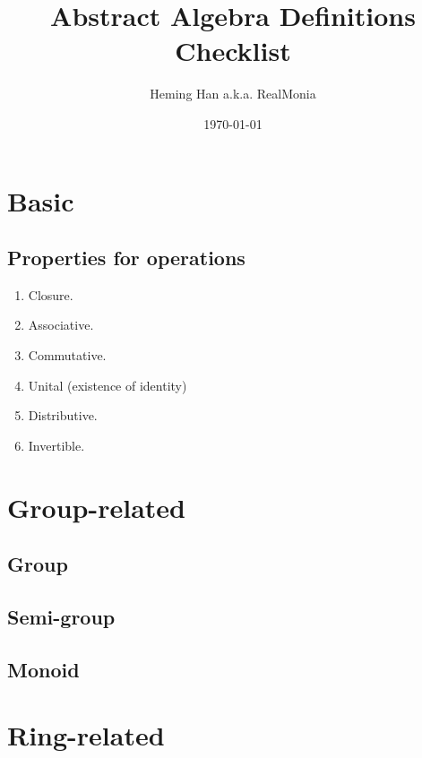 \documentclass[letter]{article}
\author{Heming Han a.k.a. RealMonia}
\title{\bf Abstract Algebra Definitions Checklist}
\date{\today}
\begin{document}
\maketitle
\section{Basic}
\subsection{Properties for operations}
\begin{enumerate}
    \item Closure.
    \item Associative.
    \item Commutative.
    \item Unital (existence of identity)
    \item Distributive.
    \item Invertible.
\end{enumerate}
\section{Group-related}
\subsection{Group}
\subsection{Semi-group}
\subsection{Monoid}
\section{Ring-related}
\end{document}
